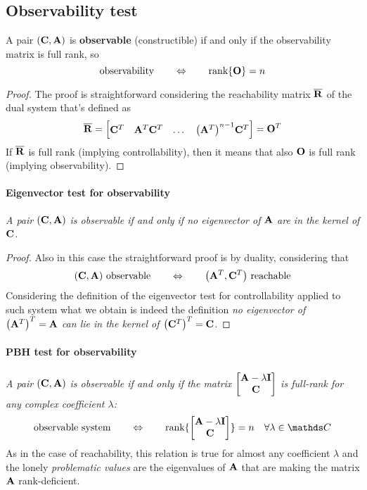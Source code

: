 \subsection{Observability test}
	A pair $(\mathbf{C},\mathbf{A})$ is \textbf{observable} (constructible) if and only if the observability matrix is full rank, so
	\begin{equation}
		\textrm{observability} \qquad \Leftrightarrow \qquad \textrm{rank}\{\mathbf{O}\} = n
	\end{equation}
	
	\begin{proof}
		The proof is straightforward considering the reachability matrix $\overline {\mathbf{R}}$ of the dual system that's defined as
		\[ \overline {\mathbf{R}} = \begin{bmatrix} \mathbf{C}^T & \mathbf{A}^T \mathbf{C}^T & \dots & \big(\mathbf{A}^T\big)^{n-1}\mathbf{C}^T \end{bmatrix} = \mathbf{O}^T \]
		If $\overline {\mathbf{R}}$ is full rank (implying controllability), then it means that also $\mathbf{O}$ is full rank (implying observability).
	\end{proof}
	
	\paragraph{Eigenvector test for observability} {\itshape A pair $(\mathbf{C},\mathbf{A})$ is observable if and only if no eigenvector of $\mathbf{A}$ are in the kernel of $\mathbf{C}$.}
	
	\begin{proof}
		Also in this case the straightforward proof is by duality, considering that
		\[ (\mathbf{C},\mathbf{A}) \textrm{ observable} \qquad \Leftrightarrow \qquad \big(\mathbf{A}^T,\mathbf{C}^T\big) \textrm{ reachable} \]
		Considering the definition of the eigenvector test for controllability applied to such system what we obtain is indeed the definition {\itshape no eigenvector of $\big(\mathbf{A}^T\big)^T = \mathbf{A}$ can lie in the kernel of $\big(\mathbf{C}^T\big)^T = \mathbf{C}$}.
	\end{proof}
	
	\paragraph{PBH test for observability} {\itshape A pair $(\mathbf{C},\mathbf{A})$ is observable if and only if the matrix $\begin{bmatrix} \mathbf{A}-\lambda \mathbf{I} \\ \mathbf{C} \end{bmatrix}$ is full-rank for any complex coefficient $\lambda$:}
	\begin{equation}
		\textrm{observable system} \qquad \Leftrightarrow \qquad \rank{\matrix{\A - \lambda \I \\ \C}} = n \quad \forall \lambda \in \mathds C
	\end{equation}
	As in the case of reachability, this relation is true for almost any coefficient $\lambda$ and the lonely \textit{problematic values} are the eigenvalues of $\mathbf{A}$ that are making the matrix $\mathbf{A}$ rank-deficient.
	
